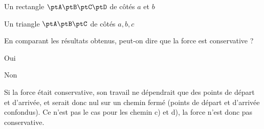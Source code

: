 
\begin{enonce}
Un rectangle $\ptA\ptB\ptC\ptD$ de côtés $a$ et $b$
\end{enonce}





\begin{enonce}
Un triangle $\ptA\ptB\ptC$ de côtés $a,b,c$
\end{enonce}





\begin{enonce}
En comparant les résultats obtenus, peut-on dire que la force est conservative ?

	\begin{listeQCM2Colonnes}
	\item Oui
	\item Non
	\end{listeQCM2Colonnes}
\end{enonce}

\reponse{\reponseB{}}

\begin{corrige}
Si la force était conservative, son travail ne dépendrait que des points de départ et d'arrivée, et serait donc nul sur un chemin fermé (points de départ et d'arrivée confondus). Ce n'est pas le cas pour les chemin c) et d), la force n'est donc pas conservative.
\end{corrige}



\finEntrainement







